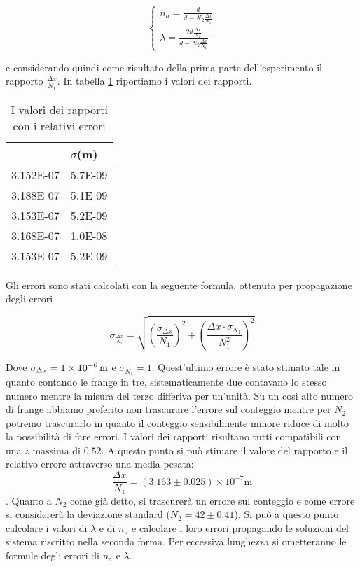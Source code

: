 \documentclass[a4paper,11pt]{article}
\newcommand{\ddfrac}[2]{\ensuremath{\frac{\displaystyle #1}{\displaystyle #2}}}
\begin{document}
	\begin{equation}
		\begin{cases}
			n_a = \ddfrac{d}{d - N_2 \frac{\Delta x}{N _1}} \\ \lambda = \ddfrac{2 d \frac{\Delta x}{N _1}}{d - N_2 \frac{\Delta x}{N _1}}
		\end{cases}
	\end{equation}

	e considerando quindi come risultato della prima parte dell'esperimento il rapporto $\frac{\Delta x}{N_1}$. In tabella \ref{rapporti} riportiamo i valori dei rapporti.
	
	\begin{table}[htbp]
  \centering
  \caption{I valori dei rapporti con i relativi errori}
    \begin{tabular}{rr}
    \bottomrule
    \rowcolor[rgb]{ .267,  .447,  .769} \multicolumn{1}{l}{\textcolor[rgb]{ 1,  1,  1}{\textbf{$\Delta x/N1$ (m)}}} & \multicolumn{1}{l}{\textcolor[rgb]{ 1,  1,  1}{\textbf{$\sigma$(m)}}} \\
    \toprule
    \rowcolor[rgb]{ .851,  .851,  .851} 3.152E-07 & 5.7E-09 \\
    3.188E-07 & 5.1E-09 \\
    \rowcolor[rgb]{ .851,  .851,  .851} 3.153E-07 & 5.2E-09 \\
    3.168E-07 & 1.0E-08 \\
    \rowcolor[rgb]{ .851,  .851,  .851} 3.153E-07 & 5.2E-09 \\
    \toprule
    \end{tabular}%
  \label{rapporti}%
\end{table}%

	Gli errori sono stati calcolati con la seguente formula, ottenuta per propagazione degli errori
	
	\begin{equation}
	\sigma _{\frac{\Delta x}{N _1}} = \sqrt{\left( \frac{\sigma _{\Delta x}}{N_1} \right) ^2 + \left( \frac{\Delta x \cdot \sigma _{N_1}}{N_1 ^2} \right) ^2}
	\end{equation}
	
	Dove $\sigma _{\Delta x} = \SI{1E-06}{m}$ e $\sigma _{N_1} = 1$. Quest'ultimo errore è stato stimato tale in quanto contando le frange in tre, sistematicamente due contavano lo stesso numero mentre la misura del terzo differiva per un'unità. Su un così alto numero di frange abbiamo preferito non trascurare l'errore sul conteggio mentre per $N _2$ potremo trascurarlo in quanto il conteggio sensibilmente minore riduce di molto la possibilità di fare errori. I valori dei rapporti risultano tutti compatibili con una $z$ massima di $0.52$.
	A questo punto si può stimare il valore del rapporto e il relativo errore attraverso una media pesata: $$\frac{\Delta x}{N _1} = (\num{3.163} \pm \num{0.025}) \times 10 ^{-7} \text{m}$$. Quanto a $N _2$ come già detto, si trascurerà un errore sul conteggio e come errore si considererà la deviazione standard ($N _2 = 42 \pm 0.41$). Si può a questo punto calcolare i valori di $\lambda$ e di $n _a$ e calcolare i loro errori propagando le soluzioni del sistema riscritto nella seconda forma. Per eccessiva lunghezza si ometteranno le formule degli errori di $n _a$ e $\lambda$.
	
\end{document}
